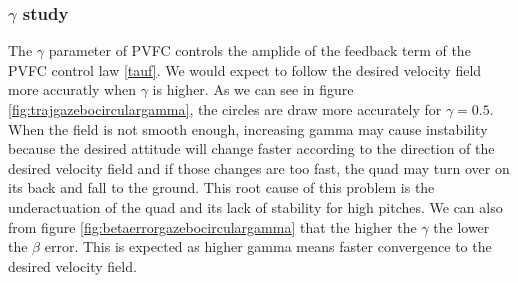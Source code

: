 \subsubsection{$\gamma$ study}
The $\gamma$ parameter of PVFC controls the amplide of the feedback term of the PVFC control law \ref{tauf}.
We would expect to follow the desired velocity field more accuratly when $\gamma$ is higher.
As we can see in figure \ref{fig:trajgazebocirculargamma}, the circles are draw more accurately for $\gamma=0.5$.
When the field is not smooth enough, increasing gamma may cause instability because the desired attitude will change faster according to the direction of the desired
velocity field and if those changes are too fast, the quad may turn over on its back and fall to the ground. This root cause of this problem is the underactuation of the quad and its lack of stability for high pitches.
We can also from figure \ref{fig:betaerrorgazebocirculargamma} that the higher the $\gamma$ the lower the $\beta$ error. This is expected as higher gamma means faster convergence to the desired velocity field.

